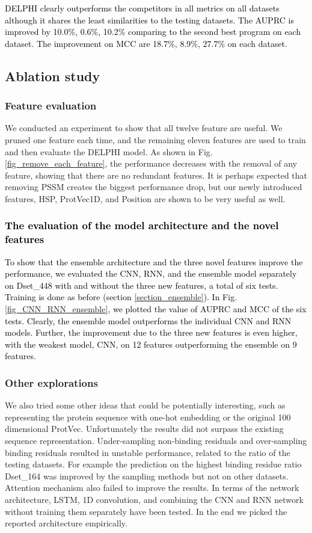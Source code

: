\documentclass{bioinfo}
\newcommand{\myColor}{black}
\begin{document}
\textcolor{\myColor}{
DELPHI clearly outperforms the competitors in all metrics on all datasets although it shares the least similarities to the testing datasets.  The AUPRC is improved by 10.0\%, 0.6\%, 10.2\% comparing to the second best program on each dataset. The improvement on MCC are 18.7\%, 8.9\%, 27.7\% on each dataset. 
}

\subsection{Ablation study}

\subsubsection{Feature evaluation}
We conducted an experiment to show that all twelve feature are useful. We pruned one feature each time, and the remaining eleven features are used to train and then evaluate the DELPHI model. As shown in Fig. \ref{fig_remove_each_feature}, the performance decreases with the removal of any feature, showing that there are no redundant features. It is perhaps expected that  removing PSSM creates the biggest performance drop, but our newly introduced features, HSP, ProtVec1D, and Position are shown to be  very useful as well. 

\textcolor{\myColor}{
\subsubsection{The evaluation of the model architecture and the novel features}
To show that the ensemble architecture and the three novel features improve the performance, we evaluated the CNN, RNN, and the ensemble model separately on Dset\_448 with and without the three new features, a total of six tests. Training is done as before (section \ref{section_ensemble}). In Fig. \ref{fig_CNN_RNN_ensemble}, we plotted the value of AUPRC and MCC of the six tests. Clearly, the ensemble model outperforms the individual CNN and RNN models. Further, the improvement due to the three new features is even higher, with the weakest model, CNN, on 12 features outperforming the ensemble on 9 features. }

\subsubsection{Other explorations}
We also tried some other ideas that could be potentially interesting, such as representing the protein sequence with one-hot embedding or the original 100 dimensional ProtVec. Unfortunately the results did not surpass the existing sequence representation. Under-sampling non-binding residuals and over-sampling binding residuals resulted in unstable performance, related to the ratio of the testing datasets. For example the prediction on the highest binding residue ratio Dset\_164 was improved by the sampling methods but not on other datasets. Attention mechanism also failed to improve the results. In terms of the network architecture, LSTM, 1D convolution, and combining the CNN and RNN network without training them separately have been tested. In the end we picked the reported architecture empirically. 
\end{document}
